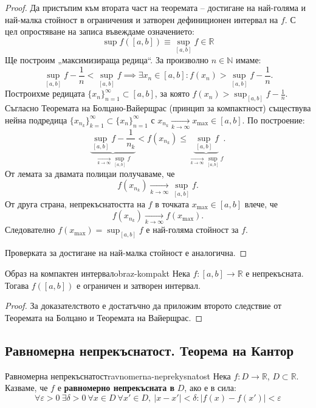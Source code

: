 \begin{proof}
Да пристъпим към втората част на теоремата -- достигане на най-голяма и най-малка стойност в ограничения и затворен дефиниционен интервал на $f$. С цел опростяване на записа въвеждаме означението:
\[
\sup f([a, b]) \equiv \sup_{[a,b]} f \in \mathbb{R}
\]
Ще построим „максимизираща редица“. За произволно $n \in \mathbb{N}$ имаме:
\[
\sup_{[a,b]} f - \frac{1}{n} < \sup_{[a,b]} f \implies \exists x_n \in [a, b] : f(x_n) > \sup_{[a,b]} f - \frac{1}{n}.
\]
Построихме редицата $\{x_n\}_{n=1}^\infty \subset [a, b]$, за която $f(x_n) > \sup_{[a,b]} f - \frac{1}{n}$. Съгласно Теоремата на Болцано-Вайерщрас (принцип за компактност) съществува нейна подредица $\{x_{n_k}\}_{k=1}^\infty \subset \{x_n\}_{n=1}^\infty$ с $x_{n_k} \xrightarrow[k \to \infty]{} x_{\max} \in [a, b]$. По построение:
\[
\underbrace{\sup_{[a,b]} f - \frac{1}{n_k}}_{\xrightarrow[k \to \infty]{} \sup_{[a,b]} f} < f(x_{n_k}) \le \underbrace{\sup_{[a,b]} f}_{\xrightarrow[k \to \infty]{} \sup_{[a,b]} f}.
\]
От лемата за двамата полицаи получаваме, че
\[
f(x_{n_k}) \xrightarrow[k \to \infty]{} \sup_{[a,b]} f.
\]
От друга страна, непрекъснатостта на $f$ в точката $x_{\max} \in [a, b]$ влече, че
\[
f(x_{n_k}) \xrightarrow[k \to \infty]{} f(x_{\max}).
\]
Следователно $f(x_{\max}) = \sup_{[a,b]} f$ е най-голяма стойност за $f$.

Проверката за достигане на най-малка стойност е аналогична.
\end{proof}

\begin{corollary}{Образ на компактен интервал}{obraz-kompakt}
Нека $f : [a, b] \to \mathbb{R}$ е непрекъсната. Тогава $f([a, b])$ е ограничен и затворен интервал.
\end{corollary}

\begin{proof}
За доказателството е достатъчно да приложим второто следствие от Теоремата на Болцано и Теоремата на Вайерщрас.
\end{proof}

\subsection{Равномерна непрекъснатост. Теорема на Кантор}

\begin{definition}{Равномерна непрекъснатост}{ravnomerna-neprekysnatost}
Нека $f : D \to \mathbb{R}$, $D \subset \mathbb{R}$. Казваме, че $f$ е \textbf{равномерно непрекъсната в} $D$, ако е в сила:
\[
\forall \varepsilon > 0\ \exists \delta > 0\ \forall x \in D\ \forall x' \in D,\ |x - x'| < \delta : |f(x) - f(x')| < \varepsilon
\]
\end{definition}

